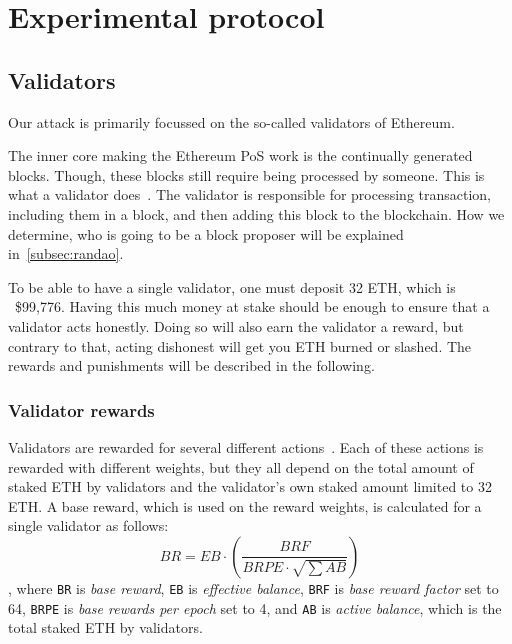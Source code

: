 

\section{Experimental protocol}\label{sec:experimental-protocol}

\subsection{Validators}\label{subsec:validator}
Our attack is primarily focussed on the so-called validators of Ethereum.

The inner core making the Ethereum PoS work is the continually generated blocks.
Though, these blocks still require being processed by someone.
This is what a validator does~\cite{Staking}.
The validator is responsible for processing transaction, including them in a block,
and then adding this block to the blockchain.
How we determine, who is going to be a block proposer will be explained in~\autoref{subsec:randao}.

To be able to have a single validator, one must deposit 32 ETH, which is ~\$99,776.
Having this much money at stake should be enough to ensure that a validator acts honestly.
Doing so will also earn the validator a reward, but contrary to that,
acting dishonest will get you ETH burned or slashed.
The rewards and punishments will be described in the following.
\subsubsection{Validator rewards}\label{subsubsec:valrewards}
Validators are rewarded for several different actions~\cite{PoSRewAndPen}.
Each of these actions is rewarded with different weights,
but they all depend on the total amount of staked ETH by validators and the validator's own staked amount limited to 32 ETH\@.
A base reward, which is used on the reward weights, is calculated for a single validator as follows:
\begin{equation}
    BR = EB\cdot(\frac{BRF}{BRPE\cdot \sqrt{\sum{AB}}})
    \label{eq:basereward}
\end{equation}, where \texttt{BR} is \textit{base reward}, \texttt{EB} is \textit{effective balance}, \texttt{BRF} is \textit{base reward factor} set to 64, \texttt{BRPE} is \textit{base rewards per epoch} set to 4, and \texttt{AB} is \textit{active balance}, which is the total staked ETH by validators.

